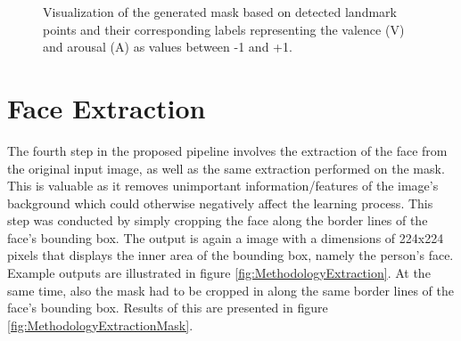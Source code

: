 \begin{figure}[ht]
  \hfill
  \caption{Visualization of the generated mask based on detected landmark points and their corresponding labels representing the valence (V) and arousal (A) as values between -1 and +1.}
  \label{fig:MethodologyMask}
\end{figure}


\section{Face Extraction}
The fourth step in the proposed pipeline involves the extraction of the face from the original input image, as well as the same extraction performed on the mask. This is valuable as it removes unimportant information/features of the image's background which could otherwise negatively affect the learning process.
\newline\newline
This step was conducted by simply cropping the face along the border lines of the face's bounding box. The output is again a image with a dimensions of 224x224 pixels that displays the inner area of the bounding box, namely the person's face. Example outputs are illustrated in figure \ref{fig:MethodologyExtraction}. At the same time, also the mask had to be cropped in along the same border lines of the face's bounding box. Results of this are presented in figure \ref{fig:MethodologyExtractionMask}.

